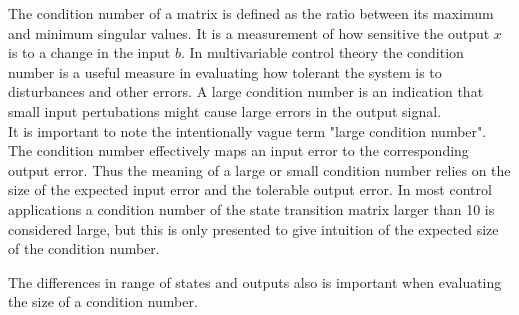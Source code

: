 The condition number of a matrix is defined as the ratio between its maximum and minimum singular values. It is a measurement of how sensitive the output $x$ is to a change in the input $b$. In multivariable control theory the condition number is a useful measure in evaluating how tolerant the system is to disturbances and other errors. A large condition number is an indication that small input pertubations might cause large errors in the output signal.\\

It is important to note the intentionally vague term "large condition number". The condition number effectively maps an input error to the corresponding output error. Thus the meaning of a large or small condition number relies on the size of the expected input error and the tolerable output error. In most control applications a condition number of the state transition matrix larger than 10 is considered large, but this is only presented to give intuition of the expected size of the condition number.

The differences in range of states and outputs also is important when evaluating the size of a condition number.



